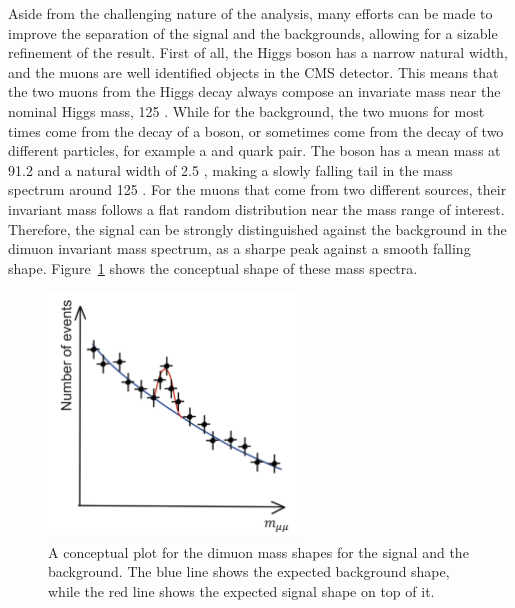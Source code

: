 Aside from the challenging nature of the \hmm analysis, many efforts can be made to improve the separation of the signal and the backgrounds, 
allowing for a sizable refinement of the result.
First of all, the Higgs boson has a narrow natural width, and the muons are well identified objects in the CMS detector.
This means that the two muons from the Higgs decay always compose an invariate mass near the nominal Higgs mass, 125 \GeV.
While for the background, the two muons for most times come from the decay of a \PZ boson, 
or sometimes come from the decay of two different particles, for example a \Pqt and \Paqt quark pair.
The \PZ boson has a mean mass at 91.2 \GeV and a natural width of 2.5 \GeV, making a slowly falling tail in the mass spectrum around 125 \GeV.
For the muons that come from two different sources, their invariant mass follows a flat random distribution near the mass range of interest.
Therefore, the signal can be strongly distinguished against the background in the dimuon invariant mass spectrum, 
as a sharpe peak against a smooth falling shape. Figure~\ref{fig:dimuon_mass_shapes} shows the conceptual shape of these mass spectra. 
\begin{figure}[!htb]
    \centering
    \captionsetup{justification=justified}
    \includegraphics[width=0.6\textwidth]{pics/hmm_mass_sketch.png}
    \caption{A conceptual plot for the dimuon mass shapes for the signal and the background. 
             The blue line shows the expected background shape, while the red line shows the expected signal shape on top of it.}
    \label{fig:dimuon_mass_shapes}
\end{figure}

